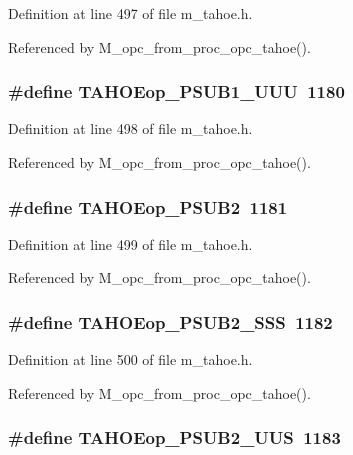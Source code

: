 Definition at line 497 of file m\_\-tahoe.h.

Referenced by M\_\-opc\_\-from\_\-proc\_\-opc\_\-tahoe().
\subsubsection{\setlength{\rightskip}{0pt plus 5cm}\#define TAHOEop\_\-PSUB1\_\-UUU~1180}\label{m__tahoe_8h_71f7313a1bea05b1e4b936d8fea2e912}




Definition at line 498 of file m\_\-tahoe.h.

Referenced by M\_\-opc\_\-from\_\-proc\_\-opc\_\-tahoe().
\subsubsection{\setlength{\rightskip}{0pt plus 5cm}\#define TAHOEop\_\-PSUB2~1181}\label{m__tahoe_8h_74e38bd321bcac76be37cd95b95bcb09}




Definition at line 499 of file m\_\-tahoe.h.

Referenced by M\_\-opc\_\-from\_\-proc\_\-opc\_\-tahoe().
\subsubsection{\setlength{\rightskip}{0pt plus 5cm}\#define TAHOEop\_\-PSUB2\_\-SSS~1182}\label{m__tahoe_8h_6795cfe999ebc4f796ac82fe7feb9b41}




Definition at line 500 of file m\_\-tahoe.h.

Referenced by M\_\-opc\_\-from\_\-proc\_\-opc\_\-tahoe().
\subsubsection{\setlength{\rightskip}{0pt plus 5cm}\#define TAHOEop\_\-PSUB2\_\-UUS~1183}\label{m__tahoe_8h_bc270391912758aa7d6bddb8b828433a}




